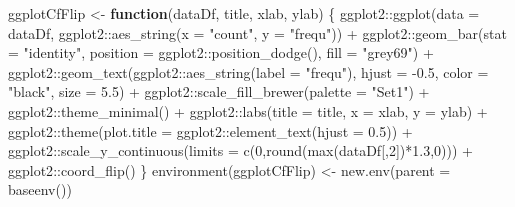 \documentclass[
]{article}
\newenvironment{Shaded}{\begin{snugshade}}{\end{snugshade}}
\newcommand{\AttributeTok}[1]{\textcolor[rgb]{0.77,0.63,0.00}{#1}}
\newcommand{\ControlFlowTok}[1]{\textcolor[rgb]{0.13,0.29,0.53}{\textbf{#1}}}
\newcommand{\DecValTok}[1]{\textcolor[rgb]{0.00,0.00,0.81}{#1}}
\newcommand{\FloatTok}[1]{\textcolor[rgb]{0.00,0.00,0.81}{#1}}
\newcommand{\FunctionTok}[1]{\textcolor[rgb]{0.00,0.00,0.00}{#1}}
\newcommand{\NormalTok}[1]{#1}
\newcommand{\OtherTok}[1]{\textcolor[rgb]{0.56,0.35,0.01}{#1}}
\newcommand{\SpecialCharTok}[1]{\textcolor[rgb]{0.00,0.00,0.00}{#1}}
\newcommand{\StringTok}[1]{\textcolor[rgb]{0.31,0.60,0.02}{#1}}
\begin{document}
\begin{Shaded}
\begin{Highlighting}[]
\NormalTok{ggplotCfFlip }\OtherTok{\textless{}{-}} \ControlFlowTok{function}\NormalTok{(dataDf, title, xlab, ylab) \{}
\NormalTok{  ggplot2}\SpecialCharTok{::}\FunctionTok{ggplot}\NormalTok{(}\AttributeTok{data =}\NormalTok{ dataDf, ggplot2}\SpecialCharTok{::}\FunctionTok{aes\_string}\NormalTok{(}\AttributeTok{x =} \StringTok{"count"}\NormalTok{, }\AttributeTok{y =} \StringTok{"frequ"}\NormalTok{)) }\SpecialCharTok{+} 
\NormalTok{    ggplot2}\SpecialCharTok{::}\FunctionTok{geom\_bar}\NormalTok{(}\AttributeTok{stat =} \StringTok{"identity"}\NormalTok{, }\AttributeTok{position =}\NormalTok{ ggplot2}\SpecialCharTok{::}\FunctionTok{position\_dodge}\NormalTok{(), }\AttributeTok{fill =} \StringTok{"grey69"}\NormalTok{) }\SpecialCharTok{+}
\NormalTok{    ggplot2}\SpecialCharTok{::}\FunctionTok{geom\_text}\NormalTok{(ggplot2}\SpecialCharTok{::}\FunctionTok{aes\_string}\NormalTok{(}\AttributeTok{label =} \StringTok{"frequ"}\NormalTok{), }\AttributeTok{hjust =} \SpecialCharTok{{-}}\FloatTok{0.5}\NormalTok{, }\AttributeTok{color =} \StringTok{"black"}\NormalTok{, }\AttributeTok{size =} \FloatTok{5.5}\NormalTok{) }\SpecialCharTok{+}
\NormalTok{    ggplot2}\SpecialCharTok{::}\FunctionTok{scale\_fill\_brewer}\NormalTok{(}\AttributeTok{palette =} \StringTok{"Set1"}\NormalTok{) }\SpecialCharTok{+}
\NormalTok{    ggplot2}\SpecialCharTok{::}\FunctionTok{theme\_minimal}\NormalTok{() }\SpecialCharTok{+}
\NormalTok{    ggplot2}\SpecialCharTok{::}\FunctionTok{labs}\NormalTok{(}\AttributeTok{title =}\NormalTok{ title, }\AttributeTok{x =}\NormalTok{ xlab, }\AttributeTok{y =}\NormalTok{ ylab) }\SpecialCharTok{+}
\NormalTok{    ggplot2}\SpecialCharTok{::}\FunctionTok{theme}\NormalTok{(}\AttributeTok{plot.title =}\NormalTok{ ggplot2}\SpecialCharTok{::}\FunctionTok{element\_text}\NormalTok{(}\AttributeTok{hjust =} \FloatTok{0.5}\NormalTok{)) }\SpecialCharTok{+}
\NormalTok{    ggplot2}\SpecialCharTok{::}\FunctionTok{scale\_y\_continuous}\NormalTok{(}\AttributeTok{limits =} \FunctionTok{c}\NormalTok{(}\DecValTok{0}\NormalTok{,}\FunctionTok{round}\NormalTok{(}\FunctionTok{max}\NormalTok{(dataDf[,}\DecValTok{2}\NormalTok{])}\SpecialCharTok{*}\FloatTok{1.3}\NormalTok{,}\DecValTok{0}\NormalTok{))) }\SpecialCharTok{+}
\NormalTok{    ggplot2}\SpecialCharTok{::}\FunctionTok{coord\_flip}\NormalTok{()}
\NormalTok{\}}
\FunctionTok{environment}\NormalTok{(ggplotCfFlip) }\OtherTok{\textless{}{-}} \FunctionTok{new.env}\NormalTok{(}\AttributeTok{parent =} \FunctionTok{baseenv}\NormalTok{())}


\end{Highlighting}
\end{Shaded}
\end{document}
